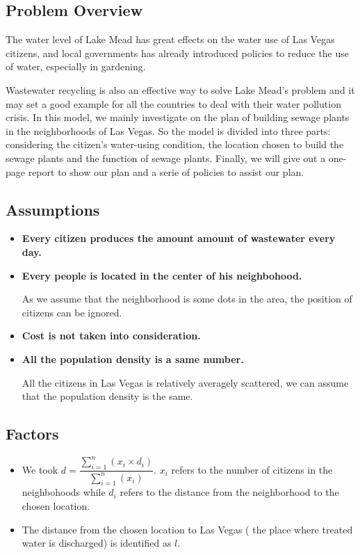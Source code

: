 \documentclass[12pt]{article}
\theoremstyle{definition}
\theoremstyle{remark}
\numberwithin{equation}{section}
\begin{document}
	\subsection{Problem Overview}
		The water level of Lake Mead has great effects on the water use of Las Vegas citizens, and local governments has already introduced policies to reduce the use of water, especially in gardening. \cite{Actions Taken}

		Wastewater recycling is also an effective way to solve Lake Mead's problem and it may set a good example for all the countries to deal with their water pollution crisis. In this model, we mainly investigate on the plan of building sewage plants in the neighborhoods of Las Vegas. So the model is divided into three parts: considering the citizen's water-using condition, the location chosen to build the sewage plants and the function of sewage plants. Finally, we will give out a one-page report to show our plan and a serie of  policies to assist our plan.

	\subsection{Assumptions}
		\begin{itemize}
			\item \textbf{Every citizen produces the amount amount of wastewater every day.}

			\item \textbf{Every people is located in the center of his neighbohood.}
			
			As we assume that the neighborhood is some dots in the area, the position of citizens can be ignored.

			\item \textbf{Cost is not taken into consideration.}

			\item \textbf{All the population density is a same number.}
			
			All the citizens in Las Vegas is relatively averagely scattered, we can assume that the population density is the same.
		\end{itemize}

	\subsection{Factors}
		\begin{itemize}
			\item We took $d=\dfrac{\sum\limits_{i=1}^n(x_i\times d_i)}{\sum\limits_{i=1}^n(x_i)}$. $x_i$ refers to the number 
			of citizens in the neighbohoods while $d_i$ refers to the distance from the neighborhood to the chosen
			location.
			\item The distance from the chosen location to Las Vegas ( the place where treated water is discharged) is identified
			as $l$.
		\end{itemize}
\end{document}
